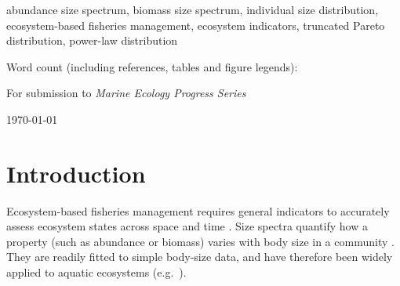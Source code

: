 \documentclass[12pt, letter]{article}
\newcommand{\wordcount}{}  %
\begin{document}
\vspace{10mm}
 abundance size spectrum, biomass size spectrum,
individual size distribution, ecosystem-based fisheries management,
ecosystem indicators, truncated Pareto distribution, power-law distribution

\medskip
\noindent Word count (including references, tables and figure legends): \wordcount



\medskip

\noindent For submission to \emph{Marine Ecology Progress Series}

\noindent \today


\clearpage

\section{Introduction}

Ecosystem-based fisheries management requires general indicators to accurately
assess ecosystem states across space and time \citep{jenn05, srjfg05}.
Size spectra quantify how a property (such as abundance or biomass) varies with
body size in a community \citep{rg96}.
They are readily fitted to simple body-size data, and have
therefore been widely applied to aquatic ecosystems
(e.g.~\citealt{dpmg04, dgpr05, bblhw12}).



\end{document}
